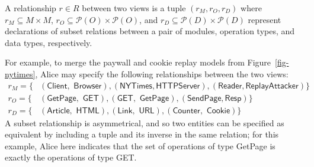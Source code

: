 \begin{defn} A relationship $r \in R$ between two views is a tuple
  $(r_{M}, r_{O}, r_{D})$ where $r_{M} \subseteq M \times M$, $r_{O}
  \subseteq \mathcal P (O) \times \mathcal P (O)$, and $r_{D}
  \subseteq \mathcal P (D) \times \mathcal P (D)$ represent
  declarations of subset relations between a pair of modules,
  operation types, and data types, respectively.
\end{defn}
For example, to merge the paywall and cookie replay models from
Figure~\ref{fig-nytimes}, Alice may specify the following
relationships between the two views:
\begin{align*}
  r_{M} = \{&(\textsf{Client$,$ Browser}),(\textsf{NYTimes$,$
    HTTPServer}), (\textsf{Reader$,$
    ReplayAttacker})\} \\
  r_{O} = \{&(\textsf{GetPage$,$ GET}), (\textsf{GET$,$ GetPage}),
  (\textsf{SendPage$,$
    Resp})\}\\
  r_{D} = \{&(\textsf{Article$,$ HTML}),(\textsf{Link$,$ URL}),
  (\textsf{Counter$,$ Cookie})\}
\end{align*}
A subset relationship is asymmetrical, and so two entities can be
specified as equivalent by including a tuple and its inverse in the
same relation; for this example, Alice here indicates that the set of
operations of type \textsf{GetPage} is exactly the operations of type
\textsf{GET}.


